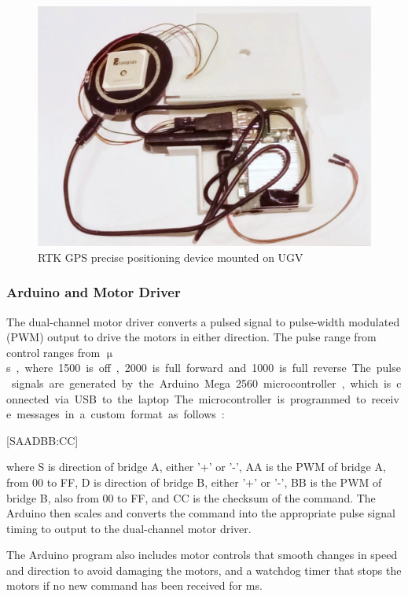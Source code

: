 \documentclass[titlepage,12pt,a4paper]{article}
\begin{document}
\begin{figure}[h]
	\centering
	\includegraphics[scale=0.2]{figures/rtk_gps.jpg}
	\caption{RTK GPS precise positioning device mounted on UGV}
	\label{figure:RTK_GPS_device}
\end{figure}

\subsubsection{Arduino and Motor Driver}
\label{motor_driver_explanation}

The dual-channel motor driver converts a pulsed signal to pulse-width modulated (PWM) output to drive the motors in either direction. The pulse range from control ranges from \unit[1000-2000]{$\upmu$s}, where 1500 is off, 2000 is full forward and 1000 is full reverse. The pulse signals are generated by the Arduino Mega 2560 microcontroller, which is connected via USB to the laptop. The microcontroller is programmed to receive messages in a custom format as follows:

\begin{center}
	[SAADBB:CC]
\end{center}

where S is direction of bridge A, either '+' or '-', AA is the PWM of bridge A, from 00 to FF, D is direction of bridge B, either '+' or '-', BB is the PWM of bridge B, also from 00 to FF, and CC is the checksum of the command. The Arduino then scales and converts the command into the appropriate pulse signal timing to output to the dual-channel motor driver.

The Arduino program also includes motor controls that smooth changes in speed and direction to avoid damaging the motors, and a watchdog timer that stops the motors if no new command has been received for \unit[500]{ms}.
\end{document}
